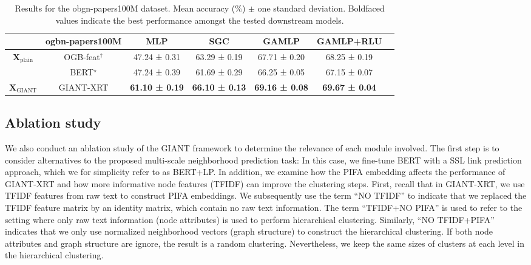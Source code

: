 \documentclass{article} \usepackage{iclr2022_conference,times}
\begin{document}
\begin{table}[t]
\setlength{\tabcolsep}{2.75pt}
\caption{Results for the obgn-papers100M dataset. Mean accuracy ($\%$) $\pm$ one standard deviation. Boldfaced values indicate the best performance amongst the tested downstream models.}
\vspace{0.1cm}
\label{tab:ogbn-papers100M}
\centering
\small
\begin{tabular}{@{}ccccccc@{}}
    \toprule
    & ogbn-papers100M & MLP & SGC & GAMLP & GAMLP+RLU \\
    \midrule
    \multicolumn{1}{c}{\multirow{2}{*}{$\mathbf{X}_{\text{plain}}$}} & OGB-feat$^\dagger$
        & 47.24 ± 0.31 & 63.29 ± 0.19 & 67.71 ± 0.20 & 68.25 ± 0.19 \\
    \multicolumn{1}{c}{} & BERT$^\star$
        & 47.24 ± 0.39 & 61.69 ± 0.29 & 66.25 ± 0.05 & 67.15 ± 0.07 \\
    \midrule
    $\mathbf{X}_{\text{GIANT}}$ & GIANT-XRT
        & \textbf{61.10 ± 0.19} & \textbf{66.10 ± 0.13} & \textbf{69.16 ± 0.08} & \textbf{69.67 ± 0.04} \\
    \bottomrule
\end{tabular}
\vspace{-0.2cm}
\end{table}

\subsection{Ablation study}
We also conduct an ablation study of the GIANT framework to determine the relevance of each module involved. The first step is to consider alternatives to the proposed multi-scale neighborhood prediction task: In this case, we fine-tune BERT with a SSL link prediction approach, which we for simplicity refer to as BERT+LP.
In addition, we examine how the PIFA embedding affects the performance of GIANT-XRT and how more informative node features (TFIDF) can improve the clustering steps. First, recall that in GIANT-XRT, we use TFIDF features from raw text to construct PIFA embeddings. We subsequently use the term ``NO TFIDF'' to indicate that we replaced the TFIDF feature matrix by an identity matrix, which contain no raw text information. The term ``TFIDF+NO PIFA'' is used to refer to the setting where only raw text information (node attributes) is used to perform hierarchical clustering. Similarly, ``NO TFIDF+PIFA'' indicates that we  only use normalized neighborhood vectors (graph structure) to construct the hierarchical clustering. If both node attributes and graph structure are ignore, the result is a random clustering. Nevertheless, we keep the same sizes of clusters at each level in the hierarchical clustering.
\end{document}
